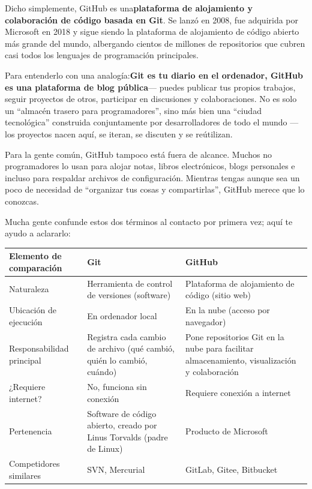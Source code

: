 


Dicho simplemente, GitHub es una\textbf{plataforma de alojamiento y colaboración de código basada en Git}. Se lanzó en 2008, fue adquirida por Microsoft en 2018 y sigue siendo la plataforma de alojamiento de código abierto más grande del mundo, albergando cientos de millones de repositorios que cubren casi todos los lenguajes de programación principales.

Para entenderlo con una analogía:\textbf{Git es tu diario en el ordenador, GitHub es una plataforma de blog pública}— puedes publicar tus propios trabajos, seguir proyectos de otros, participar en discusiones y colaboraciones. No es solo un “almacén trasero para programadores”, sino más bien una “ciudad tecnológica” construida conjuntamente por desarrolladores de todo el mundo — los proyectos nacen aquí, se iteran, se discuten y se reútilizan.

Para la gente común, GitHub tampoco está fuera de alcance. Muchos no programadores lo usan para alojar notas, libros electrónicos, blogs personales e incluso para respaldar archivos de configuración. Mientras tengas aunque sea un poco de necesidad de “organizar tus cosas y compartirlas”, GitHub merece que lo conozcas.


Mucha gente confunde estos dos términos al contacto por primera vez; aquí te ayudo a aclararlo:

\begin{center}
\begin{tabularx}{\linewidth}{|X|X|X|}
\hline
\textbf{Elemento de comparación} & \textbf{Git} & \textbf{GitHub} \tabularnewline
\hline
Naturaleza & Herramienta de control de versiones (software) & Plataforma de alojamiento de código (sitio web) \tabularnewline
Ubicación de ejecución & En ordenador local & En la nube (acceso por navegador) \tabularnewline
Responsabilidad principal & Registra cada cambio de archivo (qué cambió, quién lo cambió, cuándo) & Pone repositorios Git en la nube para facilitar almacenamiento, visualización y colaboración \tabularnewline
¿Requiere internet? & No, funciona sin conexión & Requiere conexión a internet \tabularnewline
Pertenencia & Software de código abierto, creado por Linus Torvalds (padre de Linux) & Producto de Microsoft \tabularnewline
Competidores similares & SVN, Mercurial & GitLab, Gitee, Bitbucket \tabularnewline
\hline
\end{tabularx}
\end{center}


